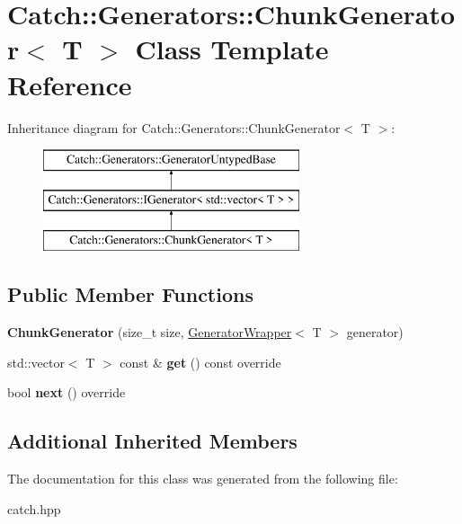 \hypertarget{classCatch_1_1Generators_1_1ChunkGenerator}{}\section{Catch\+::Generators\+::Chunk\+Generator$<$ T $>$ Class Template Reference}
\label{classCatch_1_1Generators_1_1ChunkGenerator}
Inheritance diagram for Catch\+::Generators\+::Chunk\+Generator$<$ T $>$\+:\begin{figure}[H]
\begin{center}
\leavevmode
\includegraphics[height=3.000000cm]{classCatch_1_1Generators_1_1ChunkGenerator}
\end{center}
\end{figure}
\subsection*{Public Member Functions}
\begin{DoxyCompactItemize}
\item 
\mbox{\label{classCatch_1_1Generators_1_1ChunkGenerator_a50c334d00cde3166d71e9b90ebc2d2e3}} 
{\bfseries Chunk\+Generator} (size\+\_\+t size, \mbox{\hyperlink{classCatch_1_1Generators_1_1GeneratorWrapper}{Generator\+Wrapper}}$<$ T $>$ generator)
\item 
\mbox{\label{classCatch_1_1Generators_1_1ChunkGenerator_aa41c7d08a165b6a18560f2ab9e977f0b}} 
std\+::vector$<$ T $>$ const  \& {\bfseries get} () const override
\item 
\mbox{\label{classCatch_1_1Generators_1_1ChunkGenerator_a545e89f80eb1e3c953491541ea083f86}} 
bool {\bfseries next} () override
\end{DoxyCompactItemize}
\subsection*{Additional Inherited Members}


The documentation for this class was generated from the following file\+:\begin{DoxyCompactItemize}
\item 
catch.\+hpp\end{DoxyCompactItemize}
